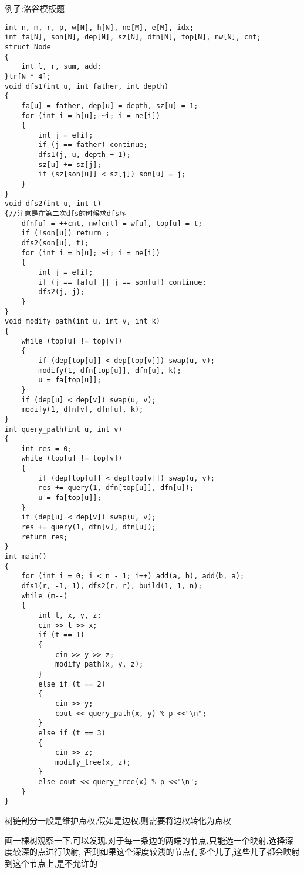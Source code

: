 \documentclass[a4paper, fontset=none]{ctexart}
\begin{document}
例子:洛谷模板题

\begin{verbatim}
int n, m, r, p, w[N], h[N], ne[M], e[M], idx;
int fa[N], son[N], dep[N], sz[N], dfn[N], top[N], nw[N], cnt;
struct Node
{
    int l, r, sum, add;
}tr[N * 4];
void dfs1(int u, int father, int depth)
{
    fa[u] = father, dep[u] = depth, sz[u] = 1;
    for (int i = h[u]; ~i; i = ne[i])
    {
        int j = e[i];
        if (j == father) continue;
        dfs1(j, u, depth + 1);
        sz[u] += sz[j];
        if (sz[son[u]] < sz[j]) son[u] = j;
    }
}
void dfs2(int u, int t)
{//注意是在第二次dfs的时候求dfs序
    dfn[u] = ++cnt, nw[cnt] = w[u], top[u] = t;
    if (!son[u]) return ;
    dfs2(son[u], t);
    for (int i = h[u]; ~i; i = ne[i])
    {
        int j = e[i];
        if (j == fa[u] || j == son[u]) continue;
        dfs2(j, j);
    }
}
void modify_path(int u, int v, int k)
{
    while (top[u] != top[v])
    {
        if (dep[top[u]] < dep[top[v]]) swap(u, v);
        modify(1, dfn[top[u]], dfn[u], k);
        u = fa[top[u]];
    }
    if (dep[u] < dep[v]) swap(u, v);
    modify(1, dfn[v], dfn[u], k);
}
int query_path(int u, int v)
{
    int res = 0;
    while (top[u] != top[v])
    {
        if (dep[top[u]] < dep[top[v]]) swap(u, v);
        res += query(1, dfn[top[u]], dfn[u]);
        u = fa[top[u]];
    }
    if (dep[u] < dep[v]) swap(u, v);
    res += query(1, dfn[v], dfn[u]);
    return res;
}
int main()
{
    for (int i = 0; i < n - 1; i++) add(a, b), add(b, a);
    dfs1(r, -1, 1), dfs2(r, r), build(1, 1, n);
    while (m--)
    {
        int t, x, y, z;
        cin >> t >> x;
        if (t == 1)
        {
            cin >> y >> z;
            modify_path(x, y, z);
        }
        else if (t == 2)
        {
            cin >> y;
            cout << query_path(x, y) % p <<"\n";
        }
        else if (t == 3)
        {
            cin >> z;
            modify_tree(x, z);
        }
        else cout << query_tree(x) % p <<"\n";
    }
}
\end{verbatim}

树链剖分一般是维护点权,假如是边权,则需要将边权转化为点权

画一棵树观察一下,可以发现,对于每一条边的两端的节点,只能选一个映射,选择深度较深的点进行映射,
否则如果这个深度较浅的节点有多个儿子,这些儿子都会映射到这个节点上,是不允许的
\end{document}
